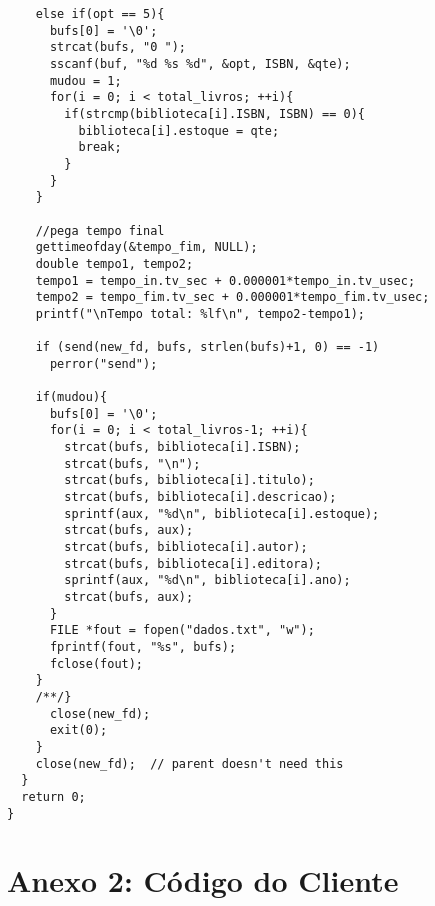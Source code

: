 \documentclass[11pt, brazil]{article} %
\begin{document}
\begin{verbatim}
	else if(opt == 5){
	  bufs[0] = '\0';
	  strcat(bufs, "0 ");
	  sscanf(buf, "%d %s %d", &opt, ISBN, &qte);
	  mudou = 1;
	  for(i = 0; i < total_livros; ++i){
	    if(strcmp(biblioteca[i].ISBN, ISBN) == 0){
	      biblioteca[i].estoque = qte;
	      break;
	    }		    				
	  }
	}
	
	//pega tempo final
	gettimeofday(&tempo_fim, NULL);
	double tempo1, tempo2;
	tempo1 = tempo_in.tv_sec + 0.000001*tempo_in.tv_usec;
	tempo2 = tempo_fim.tv_sec + 0.000001*tempo_fim.tv_usec;
	printf("\nTempo total: %lf\n", tempo2-tempo1);
							
	if (send(new_fd, bufs, strlen(bufs)+1, 0) == -1)
	  perror("send");
				
	if(mudou){
	  bufs[0] = '\0';
	  for(i = 0; i < total_livros-1; ++i){
	    strcat(bufs, biblioteca[i].ISBN);
	    strcat(bufs, "\n");
	    strcat(bufs, biblioteca[i].titulo);
	    strcat(bufs, biblioteca[i].descricao);
	    sprintf(aux, "%d\n", biblioteca[i].estoque);
	    strcat(bufs, aux);
	    strcat(bufs, biblioteca[i].autor);
	    strcat(bufs, biblioteca[i].editora);
	    sprintf(aux, "%d\n", biblioteca[i].ano);
	    strcat(bufs, aux);			
	  }
	  FILE *fout = fopen("dados.txt", "w");
	  fprintf(fout, "%s", bufs);
	  fclose(fout);
	}
	/**/}	
      close(new_fd);
      exit(0);
    }
    close(new_fd);  // parent doesn't need this
  }
  return 0;
}
\end{verbatim}


\section*{Anexo 2: Código do Cliente}
\end{document}
